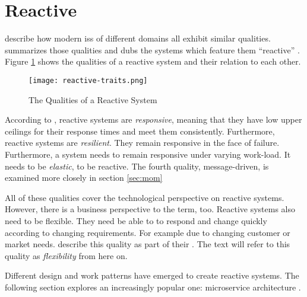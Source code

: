 
\section{Reactive }\label{sec:reactive-is}

\citeauthor{boner_reactive_2014} describe how modern \glspl{is} of different domains all exhibit similar qualities.
 summarizes those qualities and dubs the systems which feature them \enquote{reactive} \parencite{boner_reactive_2014}.
Figure \ref{fig:reactive-traits} shows the qualities of a reactive system and their relation to each other.

\begin{figure}[H]
  \centering
  \texttt{[image: reactive-traits.png]}
  \caption{The Qualities of a Reactive System \parencite{boner_reactive_2014}}
  \label{fig:reactive-traits}
\end{figure}

According to \cite{boner_reactive_2014}, reactive systems are \emph{responsive}, meaning that they have low upper ceilings for their response times and meet them consistently.
Furthermore, reactive systems are \emph{resilient}.
They remain responsive in the face of failure.
Furthermore, a system needs to remain responsive under varying work-load.
It needs to be \emph{elastic}, to be reactive.
The fourth quality, message-driven, is examined more closely in section \ref{sec:mom}

All of these qualities cover the technological perspective on reactive systems.
However, there is a business perspective to the term, too.
Reactive systems also need to be flexible.
They need be able to to respond and change quickly according to changing requirements.
For example due to changing customer or market needs.
\citeauthor{beck2001agile} describe this quality as part of their  \parencite{beck2001agile}.
The text will refer to this quality as \emph{flexibility} from here on.

Different design and work patterns have emerged to create reactive systems.
The following section explores an increasingly popular one: microservice architecture \parencite{loukides_microservice_adoption_2020}.

